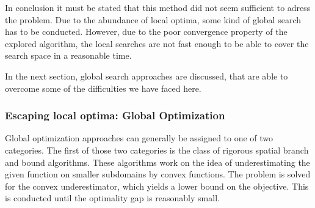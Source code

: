 \documentclass[a4paper, 12pt] {article}
\begin{document}
In conclusion it must be stated that this method did not seem sufficient to adress the problem. Due to the abundance of local optima, some kind of global search has to be conducted. However, due to the poor convergence property of the explored algorithm, the local searches are not fast enough to be able to cover the search space in a reasonable time. 

In the next section, global search approaches are discussed, that are able to overcome some of the difficulties we have faced here.
\subsubsection{Escaping local optima: Global Optimization}
\label{sec:nlp-formulation2}
Global optimization approaches can generally be assigned to one of two categories. The first of those two categories is the class of rigorous spatial branch and bound algorithms. These algorithms work on the idea of underestimating the given function on smaller subdomains by convex functions. The problem is solved for the convex underestimator, which yields a lower bound on the objective. This is conducted until the optimality gap is reasonably small.
\end{document}
